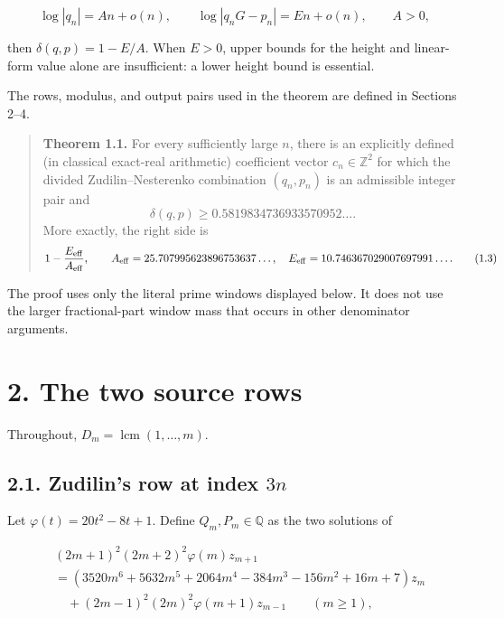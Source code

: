 \documentclass[
  11pt,
]{article}
\begin{document}
\[
 \log|q_n|=An+o(n),\qquad
 \log|q_nG-p_n|=En+o(n),\qquad A>0,
\]

then \(\delta(q,p)=1-E/A\). When \(E>0\), upper bounds for the height
and linear-form value alone are insufficient: a lower height bound is
essential.

The rows, modulus, and output pairs used in the theorem are defined in
Sections 2--4.

\begin{quote}
\textbf{Theorem 1.1.} For every sufficiently large \(n\), there is an
explicitly defined (in classical exact-real arithmetic) coefficient
vector \(c_n\in\mathbb Z^2\) for which the divided Zudilin--Nesterenko
combination \((q_n,p_n)\) is an admissible integer pair and \[
\boxed{\displaystyle
\delta(q,p)\ge
0.5819834736933570952\ldots .}                     \tag{1.2}
\] More exactly, the right side is \[
1-\frac{E_{\rm eff}}{A_{\rm eff}},\qquad
A_{\rm eff}=25.707995623896753637\ldots,\quad
E_{\rm eff}=10.746367029007697991\ldots .           \tag{1.3}
\]
\end{quote}

The proof uses only the literal prime windows displayed below. It does
not use the larger fractional-part window mass that occurs in other
denominator arguments.

\hypertarget{the-two-source-rows}{%
\section{2. The two source rows}\label{the-two-source-rows}}

Throughout, \(D_m=\operatorname{lcm}(1,\ldots,m)\).

\hypertarget{zudilins-row-at-index-3n}{%
\subsection{\texorpdfstring{2.1. Zudilin's row at index
\(3n\)}{2.1. Zudilin's row at index 3n}}\label{zudilins-row-at-index-3n}}

Let \(\varphi(t)=20t^2-8t+1\). Define \(Q_m,P_m\in\mathbb Q\) as the two
solutions of

\[
\begin{aligned}
 &(2m+1)^2(2m+2)^2\varphi(m)z_{m+1}\\
 &=(3520m^6+5632m^5+2064m^4-384m^3-156m^2+16m+7)z_m\\
 &\quad +(2m-1)^2(2m)^2\varphi(m+1)z_{m-1}\qquad(m\ge1),
\end{aligned}                                        \tag{2.1}
\]
\end{document}
